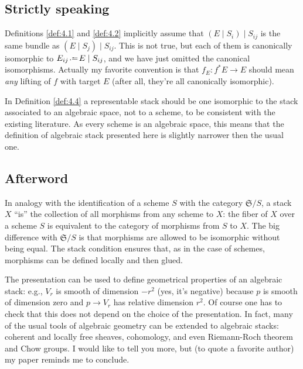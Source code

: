 \documentclass[12pt]{memoir}
\begin{document}

\subsection{Strictly speaking}
\label{sec:strictly-speaking}

Definitions \ref{def:4.1} and \ref{def:4.2} implicitly assume that $(E \mid S_i) \mid S_{ij}$ is the same bundle as $(E \mid S_j) \mid S_{ij}$. This is not true, but each of them is canonically isomorphic to $E_{ij} \defeq E \mid S_{ij}$, and we have just omitted the canonical isomorphisms. Actually my favorite convention is that $f_E\colon f^* E \to E$ should mean \emph{any} lifting of $f$ with target $E$ (after all, they're all canonically isomorphic).

In Definition \ref{def:4.4} a representable stack should be one isomorphic to the stack associated to an algebraic space, not to a scheme, to be consistent with the existing literature. As every scheme is an algebraic space, this means that the definition of algebraic stack presented here is slightly narrower then the usual one.

\subsection{Afterword}

In analogy with the identification of a scheme $S$ with the category $\mathfrak{S}/S$, a stack $X$ ``is'' the collection of all morphisms from any scheme to $X$: the fiber of $X$ over a scheme $S$ is equivalent to the category of morphisms from $S$ to $X$. The big difference with $\mathfrak{S}/S$ is that morphisms are allowed to be isomorphic without being equal. The stack condition ensures that, as in the case of schemes, morphisms can be defined locally and then glued.

The presentation can be used to define geometrical properties of an algebraic stack: e.g., $V_r$ is smooth of dimension $-r^2$ (yes, it's negative) because $p$ is smooth of dimension zero and $p \to V_r$ has relative dimension $r^2$. Of course one has to check that this does not depend on the choice of the presentation. In fact, many of the usual tools of algebraic geometry can be extended to algebraic stacks: coherent and locally free sheaves, cohomology, and even Riemann-Roch theorem and Chow groups. I would like to tell you more, but (to quote a favorite author) my paper reminds me to conclude.

\end{document}
